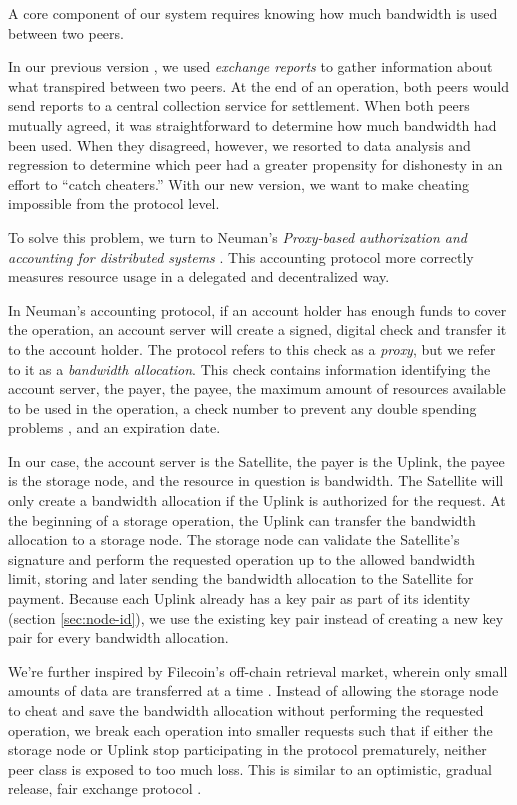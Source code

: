\documentclass[8pt,fleqn,openany]{book}
\begin{document}
A core component of our system requires knowing how much bandwidth is used
between two peers.

In our previous version \cite{storj-v2, sip9}, we used
{\em exchange reports} to gather information about what transpired between
two peers. At the end of an operation, both peers would send reports to a
central collection service for settlement. When both peers mutually agreed,
it was straightforward to determine how much bandwidth had been used.
When they disagreed, however, we resorted to data analysis and regression to
determine which peer had a greater propensity for dishonesty in an effort to
``catch cheaters.''
With our new version, we want to make cheating impossible from the protocol
level.

To solve this problem, we turn to Neuman's {\em Proxy-based authorization
and accounting for distributed systems} \cite{proxy-accounting}. This accounting
protocol more correctly measures resource usage in a delegated and decentralized
way.

In Neuman's accounting protocol, if an account holder has enough funds to
cover the operation, an account server will create a signed,
digital check and transfer it to the account holder.
The protocol refers to this check as a {\em proxy}, but we refer
to it as a {\em bandwidth allocation}. This check contains information
identifying the account server, the payer, the payee, the maximum amount of
resources available to be used in the operation, a check number to prevent
any double spending problems \cite{schneier}, and an expiration date.

In our case, the account server is the
Satellite, the payer is the Uplink, the payee is the storage node, and the
resource in question is bandwidth. The Satellite will only create a bandwidth
allocation if the Uplink is authorized for the request.
At the beginning of a storage operation, the Uplink can transfer the bandwidth
allocation to a storage node. The storage node can validate the Satellite's
signature and perform the requested operation up to the allowed bandwidth
limit, storing and later sending the bandwidth allocation to the Satellite for
payment. Because each Uplink already has a key pair as part of its identity
(section \ref{sec:node-id}), we use the existing key pair instead of
creating a new key pair for every bandwidth allocation.

We're further inspired by Filecoin's off-chain retrieval market,
wherein only small amounts of data are transferred at a time \cite{filecoin}.
Instead of allowing the storage node to cheat and save the bandwidth allocation
without performing the requested operation,
we break each operation into smaller requests such that if either the storage
node or Uplink stop participating in the protocol prematurely, neither peer
class is exposed to too much loss. This is similar to an optimistic, gradual
release, fair exchange protocol \cite{schneier}.
\end{document}

